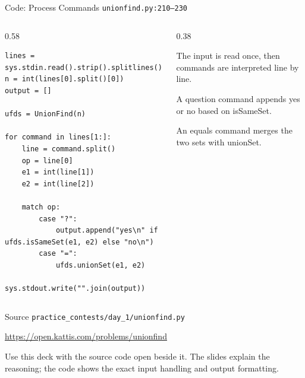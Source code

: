 \documentclass[aspectratio=169,11pt]{beamer}
\begin{document}
\begin{frame}[fragile]{Code: Process Commands}
\scriptsize
{} \texttt{unionfind.py:210--230}

\vspace{0.08cm}
\begin{columns}[T,totalwidth=\textwidth]
\begin{column}{0.58\textwidth}
\begin{lstlisting}[style=cpcode]
lines = sys.stdin.read().strip().splitlines()
n = int(lines[0].split()[0])
output = []

ufds = UnionFind(n)

for command in lines[1:]:
    line = command.split()
    op = line[0]
    e1 = int(line[1])
    e2 = int(line[2])

    match op:
        case "?":
            output.append("yes\n" if ufds.isSameSet(e1, e2) else "no\n")
        case "=":
            ufds.unionSet(e1, e2)

sys.stdout.write("".join(output))
\end{lstlisting}
\end{column}
\begin{column}{0.38\textwidth}
\begin{tightitemize}
  \item The input is read once, then commands are interpreted line by line.
  \item A question command appends yes or no based on isSameSet.
  \item An equals command merges the two sets with unionSet.
\end{tightitemize}
\end{column}
\end{columns}
\end{frame}

\begin{frame}{Source}
\small
{} \texttt{practice\_contests/day\_1/unionfind.py}

\vspace{0.3cm}
 \url{https://open.kattis.com/problems/unionfind}

\vspace{0.45cm}
Use this deck with the source code open beside it. The slides explain the reasoning; the code shows the exact input handling and output formatting.
\end{frame}
\end{document}
